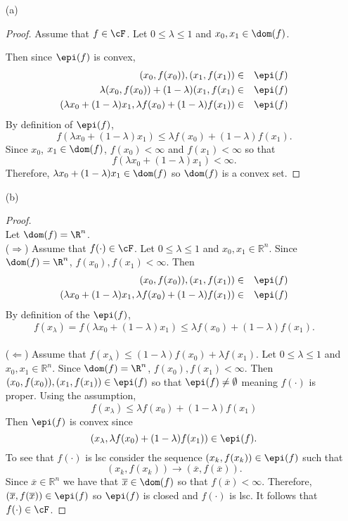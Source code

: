\documentclass[12pt]{article}
\begin{document}
\begin{itemize}
%
\item[(a)] 
\begin{proof}
Assume that $f\in\cF$. 
Let $0\leq\lambda\leq 1$ and $x_0, x_1 \in \dom(f)$. 

Then since $\epi(f)$ is convex,
\begin{eqnarray*}
(x_0,f(x_0)),(x_1,f(x_1))&\in&\epi(f) \\
\lambda(x_0,f(x_0))+(1-\lambda)(x_1,f(x_1)&\in&\epi(f)\\
(\lambda x_0+ (1-\lambda)x_1, \lambda f(x_0)+(1-\lambda)f(x_1))&\in&\epi(f) 
\end{eqnarray*}
%
By definition of $\epi(f)$, $$f(\lambda x_0+(1-\lambda)x_1) \leq \lambda f(x_0)+(1-\lambda)f(x_1).$$
Since $x_0$, $x_1 \in \dom(f)$, $f(x_0)<\infty$ and $f(x_1)<\infty$ so that
$$f(\lambda x_0+(1-\lambda)x_1)<\infty.$$
Therefore, $\lambda x_0 +(1-\lambda)x_1\in\dom(f)$ so $\dom(f)$ is a convex set. 
\end{proof}
%
\pagebreak
\item[(b)] 
\begin{proof}\quad\\ Let $\dom(f)=\R^n$.\\
($\Rightarrow$) Assume that $f(\cdot)\in\cF$. Let $0\leq\lambda\leq 1$ and $x_0, x_1\in \mathbb{R}^n$.
Since $\dom(f)=\R^n$, $f(x_0), f(x_1) <\infty$. Then
\begin{eqnarray*}
(x_0,f(x_0)),(x_1,f(x_1))&\in&\epi(f) \\
(\lambda x_0+ (1-\lambda)x_1, \lambda f(x_0)+(1-\lambda)f(x_1))&\in&\epi(f)
\end{eqnarray*}
By definition of the $\epi(f)$,
$$f(x_\lambda) = f(\lambda x_0+(1-\lambda)x_1)\leq\lambda f(x_0)+(1-\lambda)f(x_1).$$ 
\\
($\Leftarrow$) 
Assume that $f(x_\lambda) \leq(1-\lambda)f(x_0)+\lambda f(x_1).$
Let $0\leq\lambda\leq 1$ and $x_0,x_1\in\mathbb{R}^n$.
Since $\dom(f)=\R^n$, $f(x_0), f(x_1) <\infty$. 
Then $(x_0,f(x_0)),(x_1,f(x_1))\in\epi(f)$ so that $\epi(f)\neq\emptyset$ meaning $f(\cdot)$ is proper. 
Using the assumption, 
$$f(x_\lambda)\leq\lambda f(x_0)+ (1-\lambda)f(x_1)$$
Then $\epi(f)$ is convex since 
$$(x_\lambda ,\lambda f(x_0)+(1-\lambda)f(x_1))\in\epi(f).$$
To see that $f(\cdot)$ is lsc consider the sequence $(x_k,f(x_k))\in\epi(f)$ such that $$(x_k,f(x_k))\rightarrow(\overline{x},f(\overline{x})).$$
Since $\overline{x}\in\mathbb{R}^n$ we have that $\overline{x}\in\dom(f)$ so that $f(\overline{x})<\infty$.
Therefore, $(\overline{x},f(\overline{x}))\in\epi(f)$ so $\epi(f)$ is closed and $f(\cdot)$ is lsc.
It follows that $f(\cdot)\in\cF$.



\end{proof}
\end{itemize}
\end{document}
